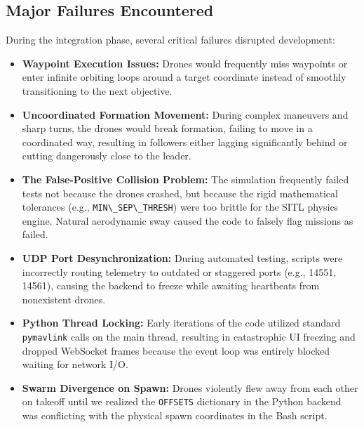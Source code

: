 \documentclass[11pt,a4paper]{article}
\newcommand{\code}[1]{\lstinline[basicstyle=\ttfamily\small,columns=fullflexible]|#1|}
\begin{document}
\subsection{Major Failures Encountered}
During the integration phase, several critical failures disrupted development:
\begin{itemize}[leftmargin=1.5em]
    \item \textbf{Waypoint Execution Issues:} Drones would frequently miss waypoints or enter infinite orbiting loops around a target coordinate instead of smoothly transitioning to the next objective.
    \item \textbf{Uncoordinated Formation Movement:} During complex maneuvers and sharp turns, the drones would break formation, failing to move in a coordinated way, resulting in followers either lagging significantly behind or cutting dangerously close to the leader.
    \item \textbf{The False-Positive Collision Problem:} The simulation frequently failed tests not because the drones crashed, but because the rigid mathematical tolerances (e.g., \code{MIN\_SEP\_THRESH}) were too brittle for the SITL physics engine. Natural aerodynamic sway caused the code to falsely flag missions as failed.
    \item \textbf{UDP Port Desynchronization:} During automated testing, scripts were incorrectly routing telemetry to outdated or staggered ports (e.g., 14551, 14561), causing the backend to freeze while awaiting heartbeats from nonexistent drones.
    \item \textbf{Python Thread Locking:} Early iterations of the code utilized standard \code{pymavlink} calls on the main thread, resulting in catastrophic UI freezing and dropped WebSocket frames because the event loop was entirely blocked waiting for network I/O.
    \item \textbf{Swarm Divergence on Spawn:} Drones violently flew away from each other on takeoff until we realized the \code{OFFSETS} dictionary in the Python backend was conflicting with the physical spawn coordinates in the Bash script.
\end{itemize}
\end{document}
